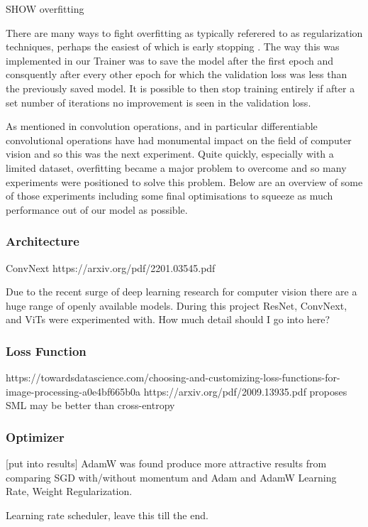 SHOW overfitting

There are many ways to fight overfitting as typically referered to as regularization techniques, perhaps the easiest of which is early stopping \cite{}.
The way this was implemented in our Trainer was to save the model after the first epoch and consquently after every other epoch for which the validation 
loss was less than the previously saved model.  It is possible to then stop training entirely if after a set number of iterations no improvement is seen 
in the validation loss.

As mentioned in  convolution operations, and in particular differentiable convolutional operations have had monumental 
impact on the field of computer vision and so this was the next experiment. Quite quickly, especially with a limited dataset, overfitting 
became a major problem to overcome and so many experiments were positioned to solve this problem.  Below are an overview of some of those 
experiments including some final optimisations to squeeze as much performance out of our model as possible.


\subsubsection{Architecture}
ConvNext https://arxiv.org/pdf/2201.03545.pdf

Due to the recent surge of deep learning research for computer vision there are a huge range of openly available models.
During this project ResNet, ConvNext, and ViTs were experimented with.  How much detail should I go into here?

\subsubsection{Loss Function}
https://towardsdatascience.com/choosing-and-customizing-loss-functions-for-image-processing-a0e4bf665b0a
https://arxiv.org/pdf/2009.13935.pdf proposes SML may be better than cross-entropy

\subsubsection{Optimizer}

[put into results]
AdamW was found produce more attractive results from comparing SGD with/without momentum and Adam and AdamW \cite{}
Learning Rate, Weight Regularization.

Learning rate scheduler, leave this till the end.

